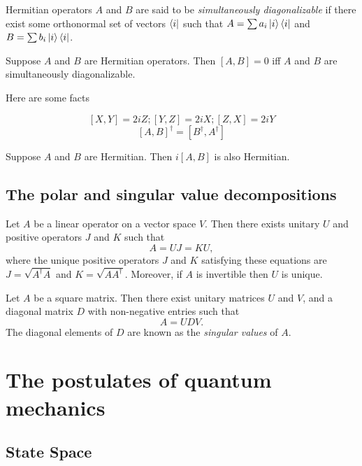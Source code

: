 \documentclass{article}
\begin{document}
\begin{definition}
  Hermitian operators $A$ and $B$ are said to be \textit{simultaneously diagonalizable} if there exist some orthonormal set of vectors $\bra{i}$ such that $A=\sum a_i\ket{i}\bra{i}$ and $B=\sum b_i\ket{i}\bra{i}$.
\end{definition}

\begin{theorem}
  Suppose $A$ and $B$ are Hermitian operators. Then $[A,B]=0$ iff $A$ and $B$ are simultaneously diagonalizable.
\end{theorem}

Here are some facts

\[
  [X,Y]=2iZ; [Y,Z]=2iX; [Z,X]=2iY
\]
\[
  [A,B]^\dagger = [B^\dagger, A^\dagger]
\]

\begin{theorem}
  Suppose $A$ and $B$ are Hermitian. Then $i[A,B]$ is also Hermitian.
\end{theorem}
\subsection{The polar and singular value decompositions}

\begin{theorem}
  Let $A$ be a linear operator on a vector space $V$. Then
  there exists unitary $U$ and positive operators $J$ and $K$
  such that
  \[A=UJ=KU,\]
  where the unique positive operators $J$ and $K$ satisfying
  these equations are $J=\sqrt{A^\dagger A}$ and $K=\sqrt{AA^\dagger}$.
  Moreover, if $A$ is invertible then $U$ is unique.
\end{theorem}

\begin{theorem}
  Let $A$ be a square matrix. Then there exist unitary matrices
  $U$ and $V$, and a diagonal matrix $D$ with non-negative entries
  such that
  \[A=UDV.\]
  The diagonal elements of $D$ are known as the
  \textit{singular values} of $A$.
\end{theorem}

\section{The postulates of quantum mechanics}
\subsection{State Space}
\end{document}
